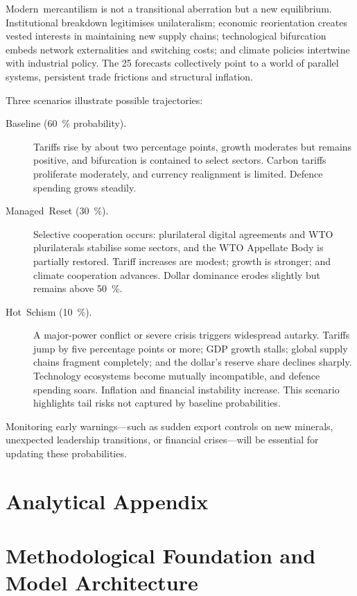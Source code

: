 \documentclass[12pt]{article}
\begin{document}
Modern mercantilism is not a transitional aberration but a new equilibrium.  Institutional breakdown legitimises unilateralism; economic reorientation creates vested interests in maintaining new supply chains; technological bifurcation embeds network externalities and switching costs; and climate policies intertwine with industrial policy.  The 25 forecasts collectively point to a world of parallel systems, persistent trade frictions and structural inflation.

Three scenarios illustrate possible trajectories:

\begin{description}
\item[Baseline (60 \% probability).]  Tariffs rise by about two percentage points, growth moderates but remains positive, and bifurcation is contained to select sectors.  Carbon tariffs proliferate moderately, and currency realignment is limited.  Defence spending grows steadily.

\item[Managed Reset (30 \%).]  Selective cooperation occurs: plurilateral digital agreements and WTO plurilaterals stabilise some sectors, and the WTO Appellate Body is partially restored.  Tariff increases are modest; growth is stronger; and climate cooperation advances.  Dollar dominance erodes slightly but remains above 50 \%.

\item[Hot Schism (10 \%).]  A major‑power conflict or severe crisis triggers widespread autarky.  Tariffs jump by five percentage points or more; GDP growth stalls; global supply chains fragment completely; and the dollar’s reserve share declines sharply.  Technology ecosystems become mutually incompatible, and defence spending soars.  Inflation and financial instability increase.  This scenario highlights tail risks not captured by baseline probabilities.
\end{description}

Monitoring early warnings—such as sudden export controls on new minerals, unexpected leadership transitions, or financial crises—will be essential for updating these probabilities.

\section{Analytical Appendix}

\section{Methodological Foundation and Model Architecture}
\end{document}
